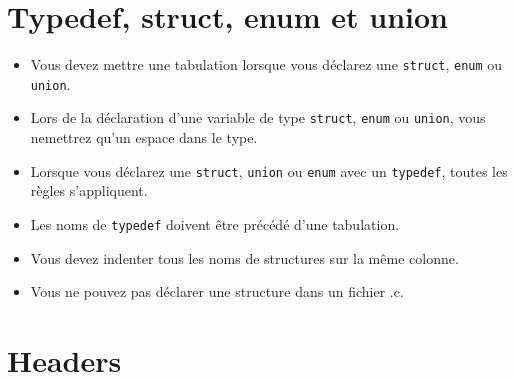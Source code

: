\documentclass{42-fr}
\begin{document}
    \section{Typedef, struct, enum et union}

        \begin{itemize}

            \item Vous devez mettre une tabulation lorsque vous déclarez une \texttt{struct}, \texttt{enum} ou \texttt{union}.

            \item Lors de la déclaration d’une variable de type \texttt{struct}, \texttt{enum} ou \texttt{union},
                vous nemettrez qu’un espace dans le type.

            \item Lorsque vous déclarez une \texttt{struct}, \texttt{union} ou \texttt{enum} avec un \texttt{typedef},
                toutes les règles s’appliquent.
            
            \item Les noms de \texttt{typedef} doivent être précédé d'une tabulation.

            \item Vous devez indenter tous les noms de structures sur la même colonne.

            \item Vous ne pouvez pas déclarer une structure dans un fichier .c.

        \end{itemize}
        \newpage


    \section{Headers}
\end{document}
